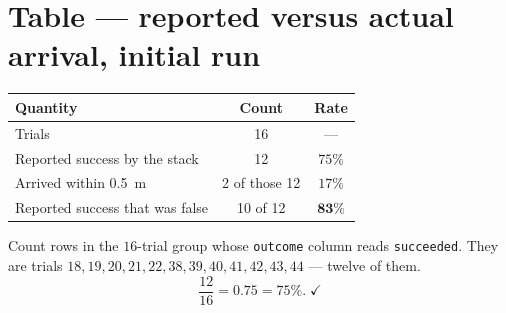 \documentclass[11pt,a4paper]{report}
\newcommand{\file}[1]{\texttt{\small #1}}
\begin{document}
\section{Table --- reported versus actual arrival, initial run}

\begin{center}
\begin{tabular}{@{}lcc@{}}
\toprule
\textbf{Quantity} & \textbf{Count} & \textbf{Rate} \\
\midrule
Trials & 16 & --- \\
Reported success by the stack & 12 & $75\%$ \\
Arrived within \SI{0.5}{\metre} & 2 of those 12 & $17\%$ \\
Reported success that was false & 10 of 12 & $\mathbf{83\%}$ \\
\bottomrule
\end{tabular}
\end{center}

\begin{handbox}
Count rows in the $16$-trial group whose \file{outcome} column reads
\file{succeeded}. They are trials
$18, 19, 20, 21, 22, 38, 39, 40, 41, 42, 43, 44$ --- twelve of them.
\[
\frac{12}{16} = 0.75 = 75\% . \;\checkmark
\]
\end{handbox}
\end{document}
